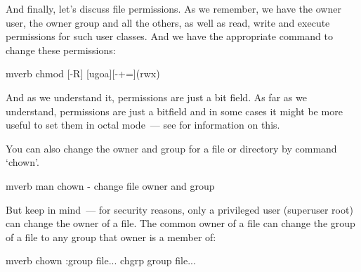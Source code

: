 And finally, let's discuss file permissions. As we remember, we have
the owner user, the owner group and all the others, as well as read, write
and execute permissions for such user classes. And we have the appropriate
command to change these permissions:
\begin{code}{mverb}
chmod [-R] [ugoa][-+=](rwx)
\end{code}
And as we understand it, permissions are just a bit field. As far as
we understand, permissions are just a bitfield and in some cases it might be
more useful to set them in octal mode~--- see
for information on this.

You can also change the owner and group for a file or directory by command `chown'.
\begin{code}{mverb}
man chown - change file owner and group
\end{code}
But keep in mind~--- for security reasons, only a privileged user
(superuser root) can change the owner of a file. The common owner of a file
can change the group of a file to any group that owner is a member of:
\begin{code}{mverb}
chown :group file...
chgrp group file...
\end{code}
